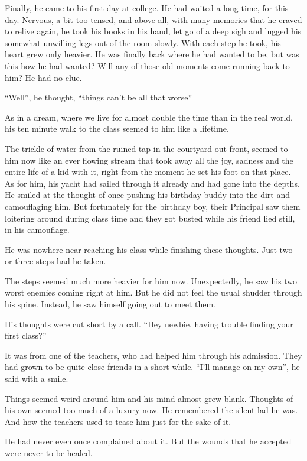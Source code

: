 \documentclass[twoside,11pt,titlepage]{article}
\begin{document}
Finally, he came to his first day at college. He had waited a long time, for this day. Nervous, a bit too tensed, and above all, with many memories that he craved to relive again, he took his books in his hand, let go of a deep sigh and lugged his somewhat unwilling legs out of the room slowly. With each step he took, his heart grew only heavier. He was finally back where he had wanted to be, but was this how he had wanted? Will any of those old moments come running back to him? He had no clue.

``Well'', he thought, ``things can't be all that worse''

As in a dream, where we live for almost double the time than in the real world, his ten minute walk to the class seemed to him like a lifetime.

The trickle of water from the ruined tap in the courtyard out front, seemed to him now like an ever flowing stream that took away all the joy, sadness and the entire life of a kid with it, right from the moment he set his foot on that place. As for him, his yacht had sailed through it already and had gone into the depths. He smiled at the thought of once pushing his birthday buddy into the dirt and camouflaging him. But fortunately for the birthday boy, their Principal saw them loitering around during class time and they got busted while his friend lied still, in his camouflage.

He was nowhere near reaching his class while finishing these thoughts. Just two or three steps had he taken.

The steps seemed much more heavier for him now. Unexpectedly, he saw his two worst enemies coming right at him. But he did not feel the usual shudder through his spine. Instead, he saw himself going out to meet them.

His thoughts were cut short by a call. ``Hey newbie, having trouble finding your first class?''

It was from one of the teachers, who had helped him through his admission. They had grown to be quite close friends in a short while. ``I'll manage on my own'', he said with a smile.

Things seemed weird around him and his mind almost grew blank. Thoughts of his own seemed too much of a luxury now. He remembered the silent lad he was. And how the teachers used to tease him just for the sake of it.

He had never even once complained about it. But the wounds that he accepted were never to be healed.
\end{document}
